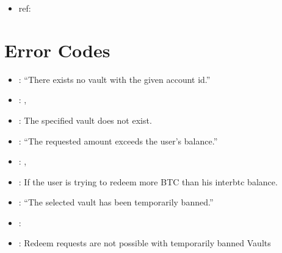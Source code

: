 \documentclass[a4paper,10pt,english]{sphinxmanual}
\begin{document}
\begin{itemize}
\item {} 
ref:

\end{itemize}


\section{Error Codes}
\label{\detokenize{spec/redeem:error-codes}}
\begin{itemize}
\item {} 
: “There exists no vault with the given account id.”

\item {} 
: {\hyperref[\detokenize{spec/redeem:requestredeem}]{}}, {\hyperref[\detokenize{spec/redeem:liquidationredeem}]{}}

\item {} 
: The specified vault does not exist.

\end{itemize}

\begin{itemize}
\item {} 
: “The requested amount exceeds the user’s balance.”

\item {} 
: {\hyperref[\detokenize{spec/redeem:requestredeem}]{}}, {\hyperref[\detokenize{spec/redeem:liquidationredeem}]{}}

\item {} 
: If the user is trying to redeem more BTC than his interbtc balance.

\end{itemize}

\begin{itemize}
\item {} 
: “The selected vault has been temporarily banned.”

\item {} 
: {\hyperref[\detokenize{spec/redeem:requestredeem}]{}}

\item {} 
:  Redeem requests are not possible with temporarily banned Vaults

\end{itemize}
\end{document}
